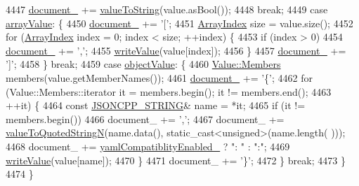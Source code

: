 \begin{DoxyCode}
4447     \hyperlink{class_json_1_1_fast_writer_a5e08c44579db8704dba1ebe37d39fdba}{document\_} += \hyperlink{namespace_json_a498503e8f49d6a3811e3c9f6757da60d}{valueToString}(value.asBool());
4448     \textcolor{keywordflow}{break};
4449   \textcolor{keywordflow}{case} \hyperlink{namespace_json_a7d654b75c16a57007925868e38212b4eadc8f264f36b55b063c78126b335415f4}{arrayValue}: \{
4450     \hyperlink{class_json_1_1_fast_writer_a5e08c44579db8704dba1ebe37d39fdba}{document\_} += \textcolor{charliteral}{'['};
4451     \hyperlink{namespace_json_a8048e741f2177c3b5d9ede4a5b8c53c2}{ArrayIndex} size = value.size();
4452     \textcolor{keywordflow}{for} (\hyperlink{namespace_json_a8048e741f2177c3b5d9ede4a5b8c53c2}{ArrayIndex} index = 0; index < size; ++index) \{
4453       \textcolor{keywordflow}{if} (index > 0)
4454         \hyperlink{class_json_1_1_fast_writer_a5e08c44579db8704dba1ebe37d39fdba}{document\_} += \textcolor{charliteral}{','};
4455       \hyperlink{class_json_1_1_fast_writer_a2ef4a2ce13a341171f01f414f4fdd765}{writeValue}(value[index]);
4456     \}
4457     \hyperlink{class_json_1_1_fast_writer_a5e08c44579db8704dba1ebe37d39fdba}{document\_} += \textcolor{charliteral}{']'};
4458   \} \textcolor{keywordflow}{break};
4459   \textcolor{keywordflow}{case} \hyperlink{namespace_json_a7d654b75c16a57007925868e38212b4eae8386dcfc36d1ae897745f7b4f77a1f6}{objectValue}: \{
4460     \hyperlink{class_json_1_1_value_a9ae9069983fc38f1928d76f9c79ac64d}{Value::Members} members(value.getMemberNames());
4461     \hyperlink{class_json_1_1_fast_writer_a5e08c44579db8704dba1ebe37d39fdba}{document\_} += \textcolor{charliteral}{'\{'};
4462     \textcolor{keywordflow}{for} (Value::Members::iterator it = members.begin(); it != members.end();
4463          ++it) \{
4464       \textcolor{keyword}{const} \hyperlink{json_8h_a1e723f95759de062585bc4a8fd3fa4be}{JSONCPP\_STRING}& name = *it;
4465       \textcolor{keywordflow}{if} (it != members.begin())
4466         document\_ += \textcolor{charliteral}{','};
4467       document\_ += \hyperlink{namespace_json_a29aff81733b8fdaabf3f1acfc3ad339f}{valueToQuotedStringN}(name.data(), \textcolor{keyword}{static\_cast<}\textcolor{keywordtype}{unsigned}\textcolor{keyword}{>}(name.length(
      )));
4468       document\_ += \hyperlink{class_json_1_1_fast_writer_a4c4c1911179bf472d24492915b0e489a}{yamlCompatiblityEnabled\_} ? \textcolor{stringliteral}{": "} : \textcolor{stringliteral}{":"};
4469       \hyperlink{class_json_1_1_fast_writer_a2ef4a2ce13a341171f01f414f4fdd765}{writeValue}(value[name]);
4470     \}
4471     document\_ += \textcolor{charliteral}{'\}'};
4472   \} \textcolor{keywordflow}{break};
4473   \}
4474 \}
\end{DoxyCode}


